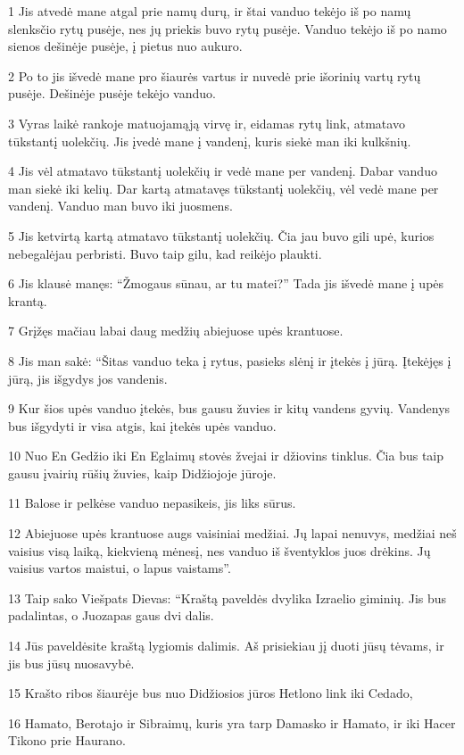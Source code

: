 \par 1 Jis atvedė mane atgal prie namų durų, ir štai vanduo tekėjo iš po namų slenksčio rytų pusėje, nes jų priekis buvo rytų pusėje. Vanduo tekėjo iš po namo sienos dešinėje pusėje, į pietus nuo aukuro. 
\par 2 Po to jis išvedė mane pro šiaurės vartus ir nuvedė prie išorinių vartų rytų pusėje. Dešinėje pusėje tekėjo vanduo. 
\par 3 Vyras laikė rankoje matuojamąją virvę ir, eidamas rytų link, atmatavo tūkstantį uolekčių. Jis įvedė mane į vandenį, kuris siekė man iki kulkšnių. 
\par 4 Jis vėl atmatavo tūkstantį uolekčių ir vedė mane per vandenį. Dabar vanduo man siekė iki kelių. Dar kartą atmatavęs tūkstantį uolekčių, vėl vedė mane per vandenį. Vanduo man buvo iki juosmens. 
\par 5 Jis ketvirtą kartą atmatavo tūkstantį uolekčių. Čia jau buvo gili upė, kurios nebegalėjau perbristi. Buvo taip gilu, kad reikėjo plaukti. 
\par 6 Jis klausė manęs: “Žmogaus sūnau, ar tu matei?” Tada jis išvedė mane į upės krantą. 
\par 7 Grįžęs mačiau labai daug medžių abiejuose upės krantuose. 
\par 8 Jis man sakė: “Šitas vanduo teka į rytus, pasieks slėnį ir įtekės į jūrą. Įtekėjęs į jūrą, jis išgydys jos vandenis. 
\par 9 Kur šios upės vanduo įtekės, bus gausu žuvies ir kitų vandens gyvių. Vandenys bus išgydyti ir visa atgis, kai įtekės upės vanduo. 
\par 10 Nuo En Gedžio iki En Eglaimų stovės žvejai ir džiovins tinklus. Čia bus taip gausu įvairių rūšių žuvies, kaip Didžiojoje jūroje. 
\par 11 Balose ir pelkėse vanduo nepasikeis, jis liks sūrus. 
\par 12 Abiejuose upės krantuose augs vaisiniai medžiai. Jų lapai nenuvys, medžiai neš vaisius visą laiką, kiekvieną mėnesį, nes vanduo iš šventyklos juos drėkins. Jų vaisius vartos maistui, o lapus vaistams”. 
\par 13 Taip sako Viešpats Dievas: “Kraštą paveldės dvylika Izraelio giminių. Jis bus padalintas, o Juozapas gaus dvi dalis. 
\par 14 Jūs paveldėsite kraštą lygiomis dalimis. Aš prisiekiau jį duoti jūsų tėvams, ir jis bus jūsų nuosavybė. 
\par 15 Krašto ribos šiaurėje bus nuo Didžiosios jūros Hetlono link iki Cedado, 
\par 16 Hamato, Berotajo ir Sibraimų, kuris yra tarp Damasko ir Hamato, ir iki Hacer Tikono prie Haurano. 
